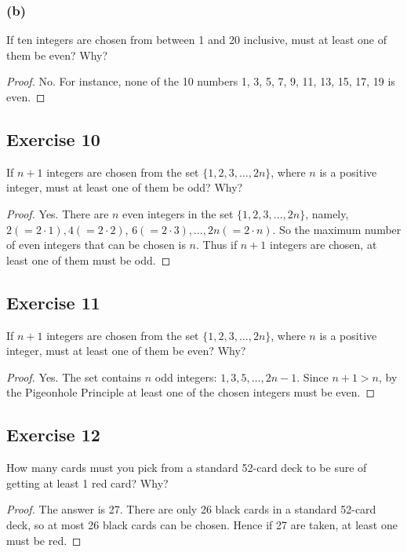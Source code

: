 \documentclass[14pt]{extarticle}
\begin{document}
\subsubsection{(b)}
If ten integers are chosen from between 1 and 20 inclusive, must at least one of them be even? Why?

\begin{proof}
     No. For instance, none of the 10 numbers 1, 3, 5, 7,
     9, 11, 13, 15, 17, 19 is even.
\end{proof}

\subsection{Exercise 10}
If \(n + 1\) integers are chosen from the set \(\{1, 2, 3, \ldots, 2n\}\), where \(n\) is a positive integer, must at
least one of them be odd? Why?

\begin{proof}
     Yes. There are \(n\) even integers in the set \(\{1, 2, 3, \ldots, 2n\}\), namely, \(2(= 2 \cdot 1), 4(= 2 \cdot 2)\), \(6(= 2 \cdot 3), \ldots, 2n(= 2 \cdot n)\). So the maximum number of even integers that can be chosen is \(n\). Thus
     if \(n + 1\) integers are chosen, at least one of them must be odd.
\end{proof}

\subsection{Exercise 11}
If \(n + 1\) integers are chosen from the set \(\{1, 2, 3, \ldots, 2n\}\), where \(n\) is a positive integer, must at
least one of them be even? Why?

\begin{proof}
     Yes. The set contains \(n\) odd integers: \(1, 3, 5, \ldots, 2n-1\). Since \(n+1 > n\), by the Pigeonhole Principle at least one of the chosen integers must be even.
\end{proof}

\subsection{Exercise 12}
How many cards must you pick from a standard 52-card deck to be sure of getting at least 1 red card? Why?

\begin{proof}
     The answer is 27. There are only 26 black cards in a standard 52-card deck, so at most 26 black cards can be chosen. Hence
     if 27 are taken, at least one must be red.
\end{proof}
\end{document}
